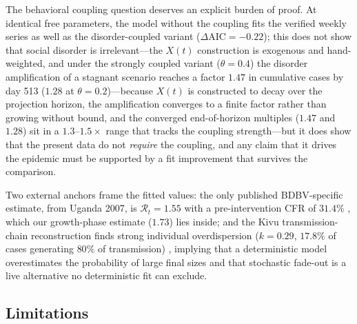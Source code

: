 \documentclass[10pt]{plos}
\newcommand{\Reff}{\mathcal{R}}
\begin{document}
The behavioral coupling question deserves an explicit burden of proof.
At identical free parameters, the model without the coupling fits the
verified weekly series as well as the disorder-coupled variant
($\Delta\mathrm{AIC}=-0.22$); this does not show that social disorder is
irrelevant---the $X(t)$ construction is exogenous and hand-weighted, and
under the strongly coupled variant ($\theta=0.4$) the disorder
amplification of a stagnant scenario reaches a factor $1.47$ in
cumulative cases by day 513 ($1.28$ at $\theta=0.2$)---because $X(t)$ is
constructed to decay over the projection horizon, the amplification
converges to a finite factor rather than growing without bound, and the
converged end-of-horizon multiples ($1.47$ and $1.28$) sit in a
$1.3$--$1.5\times$ range that tracks the coupling strength---but it does show
that the present data do
not \emph{require} the coupling, and any claim that it drives the
epidemic must be supported by a fit improvement that survives the
comparison.

Two external anchors frame the fitted values: the only published
BDBV-specific estimate, from Uganda 2007, is $\Reff_t=1.55$ with a
pre-intervention CFR of $31.4\%$
\cite{DePadua2026}, which our growth-phase estimate ($1.73$) lies
inside; and the Kivu transmission-chain reconstruction finds strong
individual overdispersion ($k=0.29$, $17.8\%$ of cases generating
$80\%$ of transmission) \cite{Soubrier2026}, implying that a
deterministic model overestimates the probability of large final sizes
and that stochastic fade-out is a live alternative no deterministic fit
can exclude.
\subsection{Limitations}\label{sec:limits}
\end{document}

